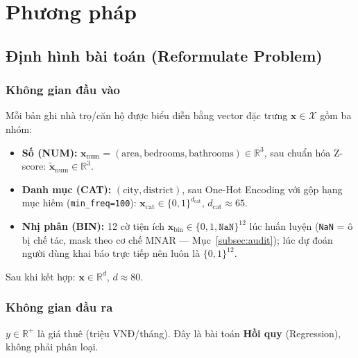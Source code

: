 \section{Phương pháp}
\label{sec:method}

\subsection{Định hình bài toán (Reformulate Problem)}
\label{subsec:formulate}

\subsubsection*{Không gian đầu vào}

Mỗi bản ghi nhà trọ/căn hộ được biểu diễn bằng vector đặc trưng
$\mathbf{x} \in \mathcal{X}$ gồm ba nhóm:

\begin{itemize}[leftmargin=*, itemsep=3pt]
  \item \textbf{Số (NUM):}
        $\mathbf{x}_\text{num} = (\text{area}, \text{bedrooms}, \text{bathrooms})
        \in \mathbb{R}^3$,
        sau chuẩn hóa Z-score: $\tilde{\mathbf{x}}_\text{num} \in \mathbb{R}^3$.
  \item \textbf{Danh mục (CAT):}
        $(\text{city}, \text{district})$, sau One-Hot Encoding với gộp hạng mục hiếm
        (\texttt{min\_freq=100}): $\mathbf{x}_\text{cat} \in \{0,1\}^{d_\text{cat}}$,
        $d_\text{cat} \approx 65$.
  \item \textbf{Nhị phân (BIN):}
        12 cờ tiện ích $\mathbf{x}_\text{bin} \in \{0, 1, \texttt{NaN}\}^{12}$
        lúc huấn luyện (\texttt{NaN} = ô bị chế tác, mask theo cơ chế MNAR —
        Mục~\ref{subsec:audit}); lúc dự đoán người dùng khai báo trực tiếp nên
        luôn là $\{0,1\}^{12}$.
\end{itemize}

Sau khi kết hợp: $\mathbf{x} \in \mathbb{R}^{d}$, $d \approx 80$.

\subsubsection*{Không gian đầu ra}

$y \in \mathbb{R}^+$ là giá thuê (triệu VNĐ/tháng).
Đây là bài toán \textbf{Hồi quy} (Regression), không phải phân loại.

